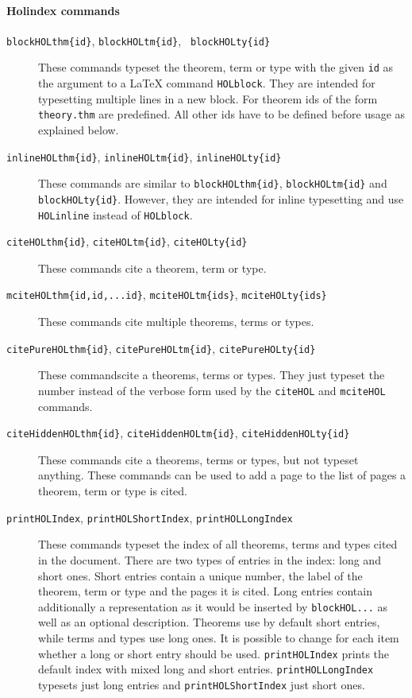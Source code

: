 \paragraph{Holindex commands}
\begin{description}
\item[\texttt{\bs{}blockHOLthm\{id\}}, \texttt{\bs{}blockHOLtm\{id\}}, \texttt{
    \bs{}blockHOLty\{id\}}] These commands typeset the theorem, term
  or type with the given \texttt{id} as the argument to a \LaTeX{}
  command \texttt{\bs{}HOLblock}. They are intended for
  typesetting multiple lines in a new block.
  For theorem ids of the form \texttt{theory.thm} are predefined. All
  other ids have to be defined before usage as explained below.
%
\item[\texttt{\bs{}inlineHOLthm\{id\}}, \texttt{\bs{}inlineHOLtm\{id\}}, \texttt{\bs{}inlineHOLty\{id\}}]
   These commands are similar to \texttt{\bs{}blockHOLthm\{id\}}, \texttt{\bs{}blockHOLtm\{id\}} and \texttt{
    \bs{}blockHOLty\{id\}}. However, they are intended for inline typesetting and
   use \texttt{\bs{}HOLinline} instead of \texttt{\bs{}HOLblock}.
%
\item[\texttt{\bs{}citeHOLthm\{id\}}, \texttt{\bs{}citeHOLtm\{id\}}, \texttt{\bs{}citeHOLty\{id\}}]
   These commands cite a theorem, term or type.
%
\item[\texttt{\bs{}mciteHOLthm\{id,id,...id\}}, \texttt{\bs{}mciteHOLtm\{ids\}}, \texttt{\bs{}mciteHOLty\{ids\}}]
   These commands cite multiple theorems, terms or types.
%
\item[\texttt{\bs{}citePureHOLthm\{id\}}, \texttt{\bs{}citePureHOLtm\{id\}},
   \texttt{\bs{}citePureHOLty\{id\}}] These commands\linebreak cite a theorems, terms or types.
   They just typeset the number instead of the
   verbose form used by the \texttt{citeHOL} and \texttt{mciteHOL} commands.

\item[\texttt{\bs{}citeHiddenHOLthm\{id\}},
   \texttt{\bs{}citeHiddenHOLtm\{id\}},
   \texttt{\bs{}citeHiddenHOLty\{id\}}] These commands cite a
   theorems, terms or types, but not typeset anything. These commands
   can be used to add a page to the list of pages a theorem, term or
   type is cited.

 \item[\texttt{\bs{}printHOLIndex}, \texttt{\bs{}printHOLShortIndex},
   \texttt{\bs{}printHOLLongIndex}] These commands typeset the index
   of all theorems, terms and types cited in the document.  There are
   two types of entries in the index: long and short ones. Short
   entries contain a unique number, the label of the theorem, term or
   type and the pages it is cited.  Long entries contain additionally
   a representation as it would be inserted by
   \texttt{\bs{}blockHOL...} as well as an optional description.
   Theorems use by default short entries, while terms and types use
   long ones.  It is possible to change for each item whether a long
   or short entry should be used. \texttt{\bs{}printHOLIndex} prints
   the default index with mixed long and short entries.
   \texttt{\bs{}printHOLLongIndex} typesets just long entries and
   \texttt{\bs{}printHOLShortIndex} just short ones.
\end{description}
